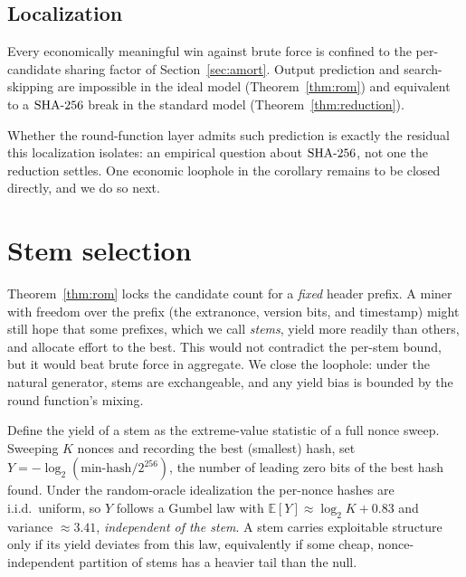 \documentclass[11pt]{article}
\begin{document}
\subsection{Localization}\label{sec:localization}

\begin{corollary}\label{cor:localization}
Every economically meaningful win against brute force is confined to the
per-candidate sharing factor of Section~\ref{sec:amort}. Output
prediction and search-skipping are impossible in the ideal model
(Theorem~\ref{thm:rom}) and equivalent to a $\mathrm{SHA\text{-}256}$ break in the standard
model (Theorem~\ref{thm:reduction}).
\end{corollary}

Whether the round-function layer admits such prediction is exactly the
residual this localization isolates: an empirical question about $\mathrm{SHA\text{-}256}$,
not one the reduction settles. One economic loophole in the corollary
remains to be closed directly, and we do so next.

\section{Stem selection}\label{sec:stem}

Theorem~\ref{thm:rom} locks the candidate count for a \emph{fixed} header
prefix. A miner with freedom over the prefix (the extranonce, version
bits, and timestamp) might still hope that some prefixes, which we call
\emph{stems}, yield more readily than others, and allocate effort to the
best. This would not contradict the per-stem bound, but it would beat
brute force in aggregate. We close the loophole: under the natural
generator, stems are exchangeable, and any yield bias is bounded by the
round function's mixing.

Define the yield of a stem as the extreme-value statistic of a full nonce
sweep. Sweeping $K$ nonces and recording the best (smallest) hash, set
$Y=-\log_2(\text{min-hash}/2^{256})$, the number of leading zero bits of
the best hash found. Under the random-oracle idealization the per-nonce
hashes are i.i.d.\ uniform, so $Y$ follows a Gumbel law with
$\mathbb{E}[Y]\approx\log_2 K + 0.83$ and variance $\approx 3.41$,
\emph{independent of the stem}. A stem carries exploitable structure only
if its yield deviates from this law, equivalently if some cheap,
nonce-independent partition of stems has a heavier tail than the null.
\end{document}
